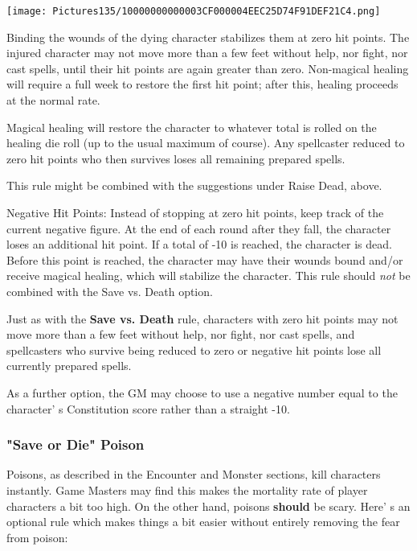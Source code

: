 \documentclass[a4paper,twoside,openany,10pt]{book}
\begin{document}
\begin{multicols}{2}
\begin{center}
	\texttt{[image: Pictures135/10000000000003CF000004EEC25D74F91DEF21C4.png]}
\end{center}

Binding the wounds of the dying character stabilizes them at zero hit points. The injured character may not move more than a few feet without help, nor fight, nor cast spells, until their hit points are again greater than zero. Non-magical healing will require a full week to restore the first hit point; after this, healing proceeds at the normal rate.

Magical healing will restore the character to whatever total is rolled on the healing die roll (up to the usual maximum of course).  Any spellcaster reduced to zero hit points who then survives loses all remaining prepared spells.

This rule might be combined with the suggestions under Raise Dead, above.

Negative Hit Points: Instead of stopping at zero hit points, keep track of the current negative figure. At the end of each round after they fall, the character loses an additional hit point. If a total of -10 is  reached, the character is dead. Before this point is reached, the character may have their wounds bound and/or receive magical healing, which will stabilize the character. This rule should \emph{not} be combined with the Save vs. Death option.

Just as with the \textbf{Save vs. Death} rule, characters with zero hit points may not move more than a few feet without help, nor fight, nor cast spells, and spellcasters who survive being reduced to zero or negative hit points lose all currently prepared spells.

As a further option, the GM may choose to use a negative number equal to the character' s Constitution score rather than a straight -10.

\subsubsection{"Save or Die" Poison}\label{save-or-die-poison}

Poisons, as described in the Encounter and Monster sections, kill characters instantly. Game Masters may find this makes the mortality rate of player characters a bit too high. On the other hand, poisons \textbf{should} be scary. Here' s an optional rule which makes things a bit easier without entirely removing the fear from poison:


\end{multicols}
\end{document}
